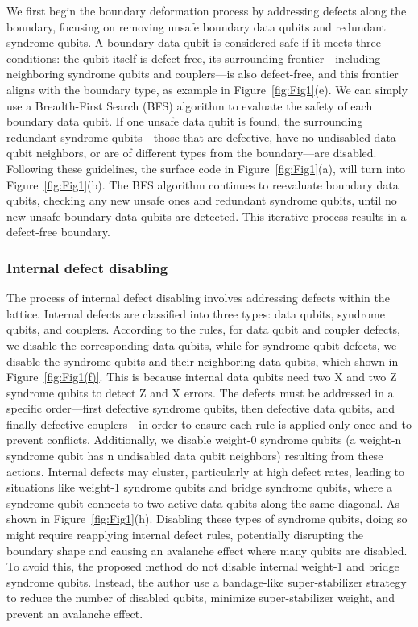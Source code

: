 We first begin the boundary deformation process by addressing defects along the boundary, focusing on removing unsafe boundary data qubits and redundant syndrome qubits. A boundary data qubit is considered safe if it meets three conditions: the qubit itself is defect-free, its surrounding frontier—including neighboring syndrome qubits and couplers—is also defect-free, and this frontier aligns with the boundary type, as example in Figure~\ref{fig:Fig1}(e). We can simply use a Breadth-First Search (BFS) algorithm to evaluate the safety of each boundary data qubit. If one unsafe data qubit is found, the surrounding redundant syndrome qubits—those that are defective, have no undisabled data qubit neighbors, or are of different types from the boundary—are disabled. Following these guidelines, the surface code in Figure~\ref{fig:Fig1}(a), will turn into Figure~\ref{fig:Fig1}(b). The BFS algorithm continues to reevaluate boundary data qubits, checking any new unsafe ones and redundant syndrome qubits, until no new unsafe boundary data qubits are detected. This iterative process results in a defect-free boundary.




\subsubsection{Internal defect disabling}

The process of internal defect disabling involves addressing defects within the lattice. Internal defects are classified into three types: data qubits, syndrome qubits, and couplers. According to the rules, for data qubit and coupler defects, we disable the corresponding data qubits, while for syndrome qubit defects, we disable the syndrome qubits and their neighboring data qubits, which shown in Figure~\ref{fig:Fig1(f)}. This is because internal data qubits need two X and two Z syndrome qubits to detect Z and X errors. The defects must be addressed in a specific order—first defective syndrome qubits, then defective data qubits, and finally defective couplers—in order to ensure each rule is applied only once and to prevent conflicts. Additionally, we disable weight-0 syndrome qubits (a weight-n syndrome qubit has n undisabled data qubit neighbors) resulting from these actions. Internal defects may cluster, particularly at high defect rates, leading to situations like weight-1 syndrome qubits and bridge syndrome qubits, where a syndrome qubit connects to two active data qubits along the same diagonal. As shown in Figure~\ref{fig:Fig1}(h). Disabling these types of syndrome qubits, doing so might require reapplying internal defect rules, potentially disrupting the boundary shape and causing an avalanche effect where many qubits are disabled. To avoid this, the proposed method do not disable internal weight-1 and bridge syndrome qubits. Instead, the author use a bandage-like super-stabilizer strategy to reduce the number of disabled qubits, minimize super-stabilizer weight, and prevent an avalanche effect. 

